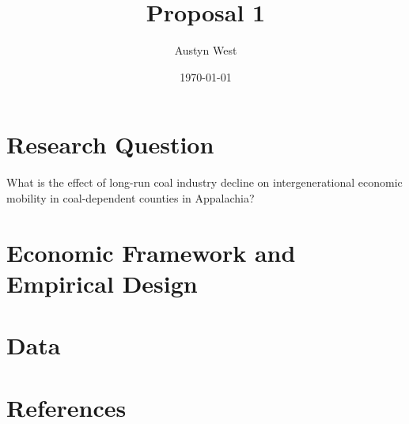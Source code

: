 \documentclass[12pt]{article}
\title{Proposal 1}
\author{Austyn West}
\date{\today}
\begin{document}
\maketitle


\section*{Research Question}
What is the effect of long-run coal industry decline on intergenerational economic mobility in 
coal-dependent counties in Appalachia?

\section*{Economic Framework and Empirical Design}

\section*{Data}


\section*{References}
\end{document}
